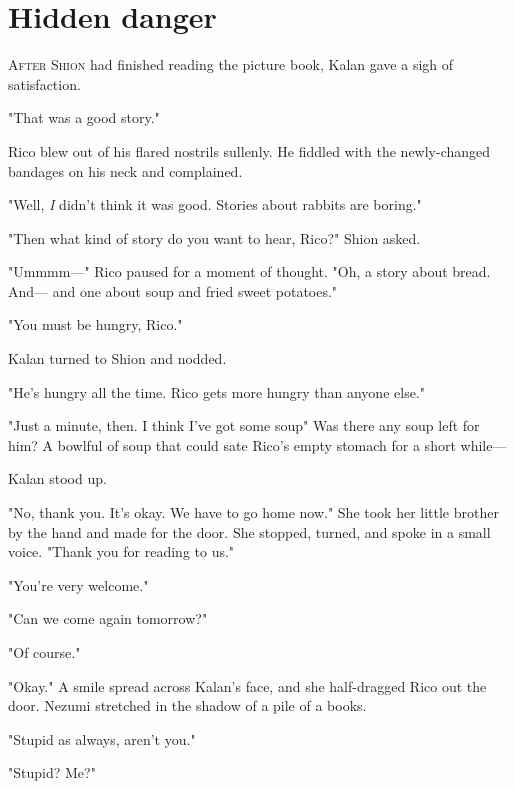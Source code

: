 
\chapter{Hidden danger}


\lettrine{A}{fter Shion} had finished reading the picture book, Kalan gave a sigh of
satisfaction.

"That was a good story."

Rico blew out of his flared nostrils sullenly. He fiddled with the
newly-changed bandages on his neck and complained.

"Well, \emph{I} didn't think it was good. Stories about rabbits are boring."

"Then what kind of story do you want to hear, Rico?" Shion asked.

"Ummmm---" Rico paused for a moment of thought. "Oh, a story about bread.
And--- and one about soup and fried sweet potatoes."

"You must be hungry, Rico."

Kalan turned to Shion and nodded.

"He's hungry all the time. Rico gets more hungry than anyone else."

"Just a minute, then. I think I've got some soup\el " Was there any soup
left for him? A bowlful of soup that could sate Rico's empty stomach for
a short while---

Kalan stood up.

"No, thank you. It's okay. We have to go home now." She took her little
brother by the hand and made for the door. She stopped, turned, and
spoke in a small voice. "Thank you for reading to us."

"You're very welcome."

"Can we come again tomorrow?"

"Of course."

"Okay." A smile spread across Kalan's face, and she half-dragged Rico
out the door. Nezumi stretched in the shadow of a pile of a books.

"Stupid as always, aren't you."

"Stupid? Me?"

